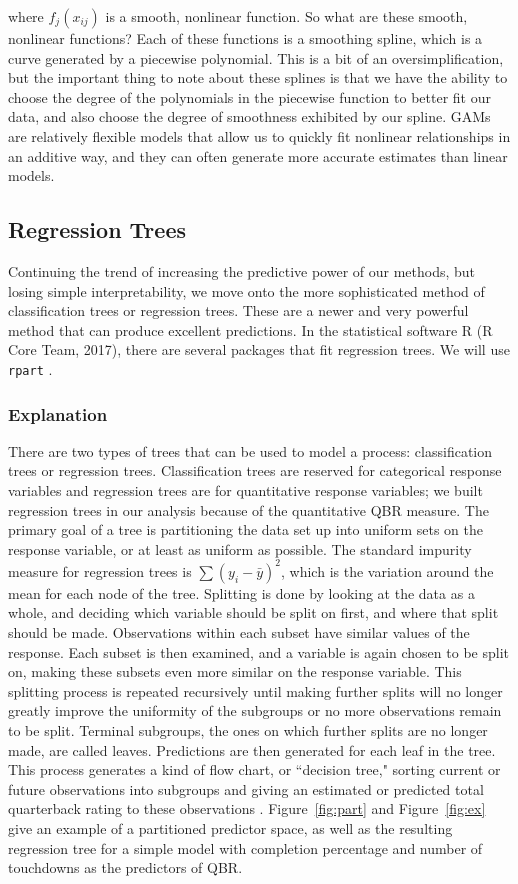 \documentclass[12pt]{article}\usepackage[]{graphicx}\usepackage[]{color}
\begin{document}
where $f_{j}(x_{ij})$ is a smooth, nonlinear function. So what are these smooth, nonlinear functions? Each of these functions is a smoothing spline, which is a curve generated by a piecewise polynomial. This is a bit of an oversimplification, but the important thing to note about these splines is that we have the ability to choose the degree of the polynomials in the piecewise function to better fit our data, and also choose the degree of smoothness exhibited by our spline. GAMs are relatively flexible models that allow us to quickly fit nonlinear relationships in an additive way, and they can often generate more accurate estimates than linear models.


\subsection{Regression Trees}
Continuing the trend of increasing the predictive power of our methods, but losing simple interpretability, we move onto the more sophisticated method of classification trees or regression trees. These are a newer and very powerful method that can produce excellent predictions. In the statistical software R (R Core Team, 2017), there are several packages that fit regression trees. We will use \texttt{rpart} \cite{rpart}.

\subsubsection{Explanation}
There are two types of trees that can be used to model a process: classification trees or regression trees. Classification trees are reserved for categorical response variables and regression trees are for quantitative response variables; we built regression trees in our analysis because of the quantitative QBR measure. The primary goal of a tree is partitioning the data set up into uniform sets on the response variable, or at least as uniform as possible. The standard impurity measure for regression trees is $\sum(y_{i}-\bar{y})^{2}$, which is the variation around the mean for each node of the tree. Splitting is done by looking at the data as a whole, and deciding which variable should be split on first, and where that split should be made. Observations within each subset have similar values of the response. Each subset is then examined, and a variable is again chosen to be split on, making these subsets even more similar on the response variable. This splitting process is repeated recursively until making further splits will no longer greatly improve the uniformity of the subgroups or no more observations remain to be split. Terminal subgroups, the ones on which further splits are no longer made, are called leaves. Predictions are then generated for each leaf in the tree. This process generates a kind of flow chart, or ``decision tree," sorting current or future observations into subgroups and giving an estimated or predicted total quarterback rating to these observations \cite{gam}. Figure~\ref{fig:part} and Figure~\ref{fig:ex} give an example of a partitioned predictor space, as well as the resulting regression tree for a simple model with completion percentage and number of touchdowns as the predictors of QBR.
\newpage
\end{document}
